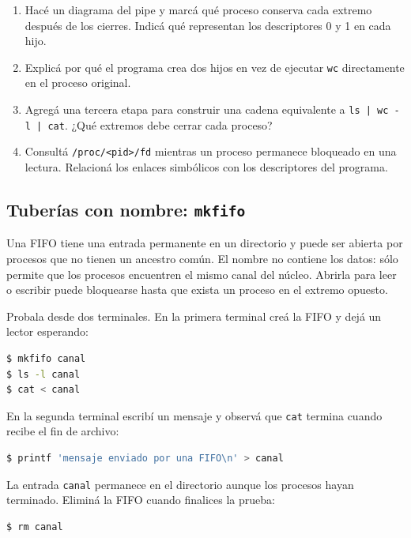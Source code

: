 \documentclass[11pt,a4paper]{article}
\begin{document}
\begin{extrabox}
\begin{enumerate}
  \item Hacé un diagrama del pipe y marcá qué proceso conserva cada extremo después de
  los cierres. Indicá qué representan los descriptores 0 y 1 en cada hijo.
  \item Explicá por qué el programa crea dos hijos en vez de ejecutar
  \texttt{wc} directamente en el proceso original.
  \item Agregá una tercera etapa para construir una cadena equivalente a
  \texttt{ls | wc -l | cat}. ¿Qué extremos debe cerrar cada proceso?
  \item Consultá \texttt{/proc/<pid>/fd} mientras un proceso permanece
  bloqueado en una lectura. Relacioná los enlaces simbólicos con los
  descriptores del programa.
\end{enumerate}
\end{extrabox}

\subsection{Tuberías con nombre: \texttt{mkfifo}}

Una FIFO tiene una entrada permanente en un directorio y puede ser abierta por
procesos que no tienen un ancestro común. El nombre no contiene los datos: sólo
permite que los procesos encuentren el mismo canal del núcleo. Abrirla para
leer o escribir puede bloquearse hasta que exista un proceso en el extremo
opuesto.

Probala desde dos terminales. En la primera terminal creá la FIFO y dejá un
lector esperando:

\begin{lstlisting}[language=bash]
$ mkfifo canal
$ ls -l canal
$ cat < canal
\end{lstlisting}

En la segunda terminal escribí un mensaje y observá que \texttt{cat} termina
cuando recibe el fin de archivo:

\begin{lstlisting}[language=bash]
$ printf 'mensaje enviado por una FIFO\n' > canal
\end{lstlisting}

La entrada \texttt{canal} permanece en el directorio aunque los procesos hayan
terminado. Eliminá la FIFO cuando finalices la prueba:

\begin{lstlisting}[language=bash]
$ rm canal
\end{lstlisting}
\end{document}
